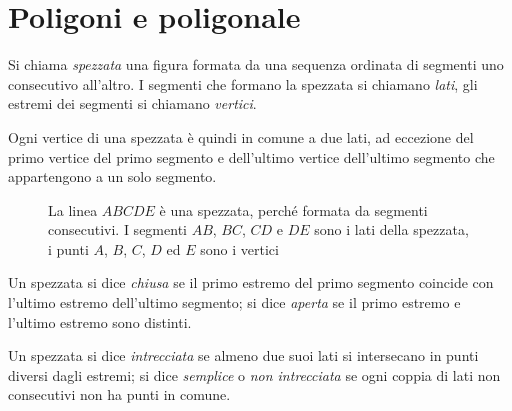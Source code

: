 \vspazio\ovalbox{\risolvii \ref{ese:1.104}, \ref{ese:1.105}, 
\ref{ese:1.106}, \ref{ese:1.107}, \ref{ese:1.108}, \ref{ese:1.109}, 
\ref{ese:1.110}, \ref{ese:1.111}, \ref{ese:1.112}, \ref{ese:1.113}, 
\ref{ese:1.114},}

\ovalbox{\ref{ese:1.115}, \ref{ese:1.116}, \ref{ese:1.117}, 
\ref{ese:1.118}, \ref{ese:1.119}, \ref{ese:1.120}, \ref{ese:1.121}, 
\ref{ese:1.122}, \ref{ese:1.123}, \ref{ese:1.124}}


\section{Poligoni e poligonale}\label{sect:poligoni}

\begin{definizione}
Si chiama \emph{spezzata} una figura formata da una sequenza ordinata 
di segmenti uno consecutivo all'altro. I segmenti che formano la 
spezzata si chiamano \emph{lati}, gli estremi dei segmenti si 
chiamano \emph{vertici}.
\end{definizione}

Ogni vertice di una spezzata è quindi in comune a due lati, ad 
eccezione del primo vertice del primo segmento e dell'ultimo vertice 
dell'ultimo segmento che appartengono a un solo segmento.


\begin{inaccessibleblock}
 \begin{figure}[htb]
\centering
\caption{La linea $ABCDE$ è una spezzata, perché formata da segmenti 
consecutivi. I segmenti $AB$, $BC$, $CD$ e $DE$ sono i lati della 
spezzata, i punti $A$, $B$, $C$, $D$ ed $E$ sono i vertici}
\end{figure}
\end{inaccessibleblock}

\begin{definizione}
Un spezzata si dice \emph{chiusa} se il primo estremo del primo 
segmento coincide con l'ultimo estremo dell'ultimo segmento; si dice 
\emph{aperta} se il primo estremo e l'ultimo estremo sono distinti.
\end{definizione}

\begin{definizione}
Un spezzata si dice \emph{intrecciata} se almeno due suoi lati si 
intersecano in punti diversi dagli estremi; si dice \emph{semplice} o 
\emph{non intrecciata} se ogni coppia di lati non consecutivi non ha 
punti in comune.
\end{definizione}


